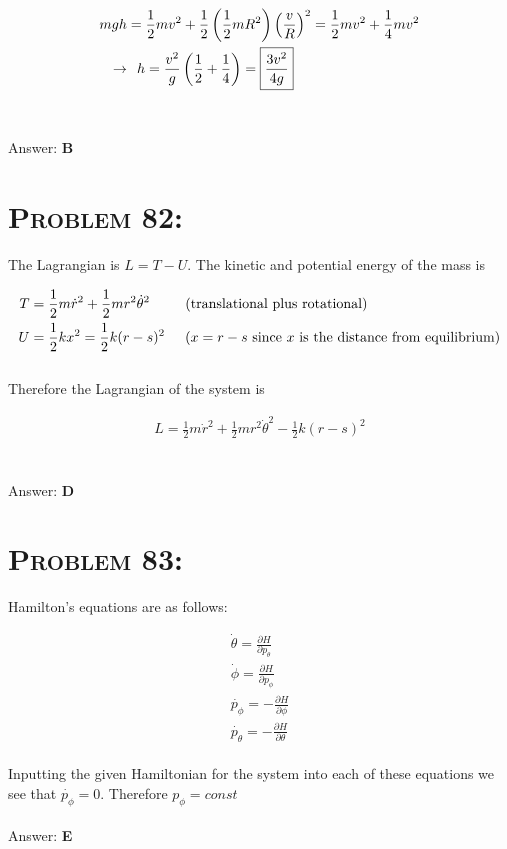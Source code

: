 \documentclass{article}
\begin{document}
\begin{align}
mgh &= \frac{1}{2} m v^{2} + \frac{1}{2} \left(\frac{1}{2} m R^2\right) \left(\frac{v}{R}\right)^{2} = \frac{1}{2} m v^{2} + \frac{1}{4} m v^{2}\nonumber\\
\rightarrow & \hspace{.1in} h = \frac{v^2}{g}\left(\frac{1}{2} + \frac{1}{4}\right) = \boxed{\frac{3v^2}{4g}}\nonumber
\end{align}
\\\\
Answer: \textbf{\textcolor{ProcessBlue}B}\\


\section{\textsc{Problem 82:}} The Lagrangian is $L = T - U$. The kinetic and potential energy of the mass is

\begin{align}
T &=  \frac{1}{2} m \dot{r}^{2}  + \frac{1}{2} m r^2 \dot{\theta}^{2} \hspace{.35in} \text{(translational plus rotational)}\\
U &= \frac{1}{2} k x^{2} = \frac{1}{2} k (r-s)^2 \hspace{.2in} \text{($x = r-s$ since $x$ is the distance from equilibrium)}
\end{align}
\\
Therefore the Lagrangian of the system is

\begin{align}
\boxed{L = \frac{1}{2} m \dot{r}^{2}  + \frac{1}{2} m r^2 \dot{\theta}^{2} - \frac{1}{2} k (r-s)^2}\nonumber
\end{align}
\\\\
Answer: \textbf{\textcolor{ProcessBlue}D}\\


\section{\textsc{Problem 83:}} Hamilton's equations are as follows:

\begin{gather}
\dot{\theta} = \frac{\partial H}{\partial p_{\theta}}\\
\dot{\phi} = \frac{\partial H}{\partial p_{\phi}}\\
\dot{p_{\phi}} = -\frac{\partial H}{\partial \phi}\\
\dot{p_{\theta}} = -\frac{\partial H}{\partial \theta}
\end{gather}
\\
Inputting the given Hamiltonian for the system into each of these equations we see that $\dot{p_{\phi}} = 0$. Therefore  $\boxed{p_{\phi} = const}$
\\\\
Answer: \textbf{\textcolor{ProcessBlue}E}\\
\end{document}
